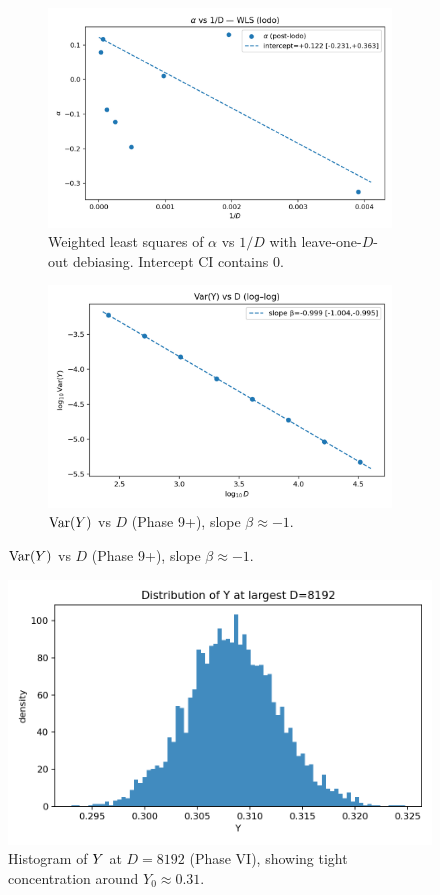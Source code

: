 \begin{figure}[h]
\begin{figure}[h]
\centering
\includegraphics[width=0.78\linewidth]{../phase9-plus-haar-extend/figures/phase9_alpha_vs_invD_haar_signed_wls_lodo.png}
\caption{Weighted least squares of $\alpha$ vs $1/D$ with leave-one-$D$-out debiasing. Intercept CI contains $0$.}
\end{figure}

\begin{figure}[h]
\centering
\includegraphics[width=0.78\linewidth]{../phase9-plus-haar-extend/figures/phase9_varY_vs_D_haar.png}
\caption{$\mathrm{Var}(Y)$ vs $D$ (Phase 9+), slope $\beta \approx -1$.}
\end{figure}
\end{figure}

\begin{figure}[h]
\centering
\includegraphics[width=0.72\linewidth]{../figures/phase6_Y_hist_Dmax.png}
\caption{Histogram of $Y$ at $D=8192$ (Phase VI), showing tight concentration around $Y_0\approx 0.31$.}
\end{figure}

